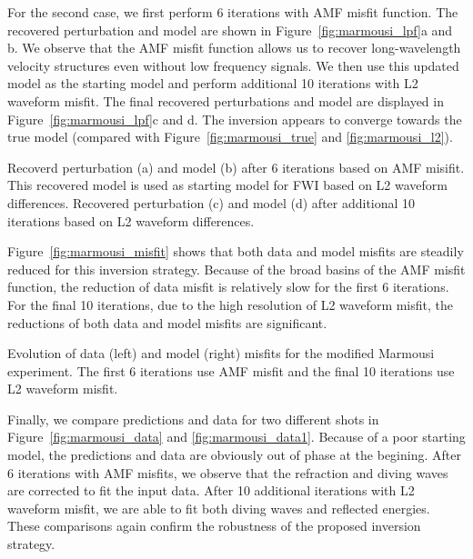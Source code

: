 For the second case, we first perform 6 iterations with AMF misfit function. 
The recovered 
perturbation and model are shown in Figure~\ref{fig:marmousi_lpf}a and b. We observe that 
the AMF misfit function allows us to recover long-wavelength velocity structures even 
without low frequency signals. We then use this updated model as the starting model 
and perform additional 10 iterations with L2 waveform misfit. The final recovered 
perturbations and model are displayed in Figure~\ref{fig:marmousi_lpf}c and d. 
The inversion appears to converge towards the true model (compared with Figure~\ref{fig:marmousi_true}
and \ref{fig:marmousi_l2}). 

{\label{fig:marmousi_lpf} 
Recoverd perturbation (a) and model (b) after 6 iterations based on 
AMF misifit. This recovered model is used as starting model for FWI based on L2 waveform differences.
Recovered perturbation (c) and model (d) after additional 10 iterations based on L2 waveform differences.}

Figure~\ref{fig:marmousi_misfit} shows that both data and model misfits are steadily reduced 
for this inversion strategy. Because of the broad basins of the AMF misfit function, the reduction 
of data misfit is relatively slow for the first 6 iterations. For the final 10 iterations, due to 
the high resolution of L2 waveform misfit, the reductions of both data and model misfits are significant. 

{\label{fig:marmousi_misfit} Evolution of data (left) and model (right) misfits
for the modified Marmousi experiment. The first 6 iterations use AMF misfit and the final 10 
iterations use L2 waveform misfit.}

Finally, we compare predictions and data for two different shots in Figure~\ref{fig:marmousi_data} and 
\ref{fig:marmousi_data1}. 
Because of a poor starting 
model, the predictions and data are obviously out of phase at the begining. 
After 6 iterations with AMF misfits, 
we observe that the refraction and diving waves are corrected to fit the input data. 
After 10 additional iterations with L2 waveform misfit, we are able to fit both diving waves and 
reflected energies. These comparisons again confirm the robustness of the proposed inversion strategy. 

